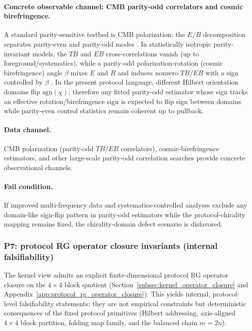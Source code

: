 \paragraph{Concrete observable channel: CMB parity-odd correlators and cosmic birefringence.}
A standard parity-sensitive testbed is CMB polarization: the $E/B$ decomposition separates parity-even and parity-odd modes \cite{ZaldarriagaSeljak1997,KamionkowskiKosowskyStebbins1997}.
In statistically isotropic parity-invariant models, the $TB$ and $EB$ cross-correlations vanish (up to foreground/systematics), while a parity-odd polarization-rotation (cosmic birefringence) angle $\beta$ mixes $E$ and $B$ and induces nonzero $TB/EB$ with a sign controlled by $\beta$ \cite{LueWangKamionkowski1999,MinamiKomatsu2020}.
In the present protocol language, different Hilbert orientation domains flip $\mathrm{sgn}(\chi)$; therefore any fitted parity-odd estimator whose sign tracks an effective rotation/birefringence sign is expected to flip sign between domains while parity-even control statistics remain coherent up to pullback.

\paragraph{Data channel.}
CMB polarization (parity-odd $TB/EB$ correlators), cosmic-birefringence estimators, and other large-scale parity-odd correlation searches provide concrete observational channels.

\paragraph{Fail condition.}
If improved multi-frequency data and systematics-controlled analyses exclude any domain-like sign-flip pattern in parity-odd estimators while the protocol-chirality mapping remains fixed, the chirality-domain defect scenario is disfavored.

\subsubsection{P7: protocol RG operator closure invariants (internal falsifiability)}
\label{subsec:p7_rg_operator_audits}

The kernel view admits an explicit finite-dimensional protocol RG operator closure on the $4\times4$ block quotient (Section~\ref{subsec:kernel_operator_closure} and Appendix~\ref{app:protocol_rg_operator_closure}).
This yields internal, protocol-level falsifiability statements: they are not empirical constraints but deterministic consequences of the fixed protocol primitives (Hilbert addressing, axis-aligned $4\times4$ block partition, folding map family, and the balanced chain $m=2n$).

